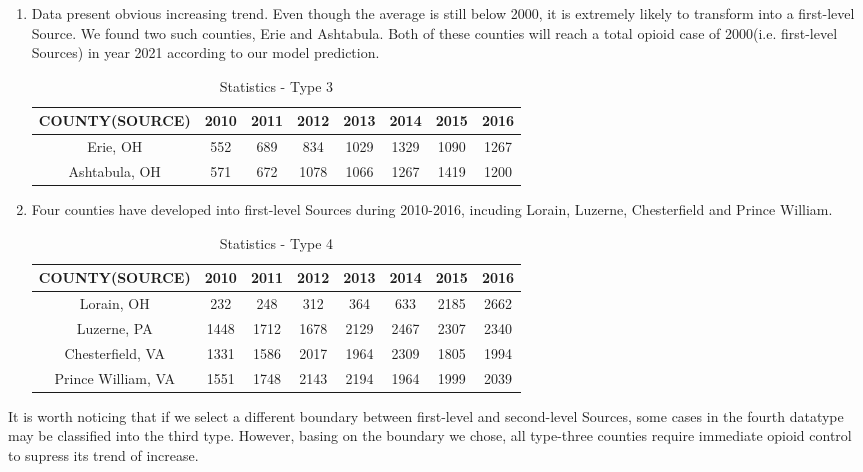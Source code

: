 \begin{enumerate}
	\item Data present obvious increasing trend. Even though the average is still below 2000, it is extremely likely to transform into a first-level Source. We found two such counties, Erie and Ashtabula. Both of these counties will reach a total opioid case of 2000(i.e. first-level Sources) in year 2021 according to our model prediction.
	\begin{table}[H]
		\centering
		\begin{tabular}{|c|c|c|c|c|c|c|c|}
			\hline
			\rowcolor[HTML]{656565} 
			{\color[HTML]{FFFFFF} \textbf{COUNTY(SOURCE)}} & {\color[HTML]{FFFFFF} \textbf{2010}} & {\color[HTML]{FFFFFF} \textbf{2011}} & {\color[HTML]{FFFFFF} \textbf{2012}} & {\color[HTML]{FFFFFF} \textbf{2013}} & {\color[HTML]{FFFFFF} \textbf{2014}} & {\color[HTML]{FFFFFF} \textbf{2015}} & {\color[HTML]{FFFFFF} \textbf{2016}}\\ \hline
			 Erie, OH &552&689&834&1029&1329&1090&1267 \\ \hline
			 Ashtabula, OH&571&672&1078&1066&1267&1419&1200 \\ \hline
		\end{tabular}
		\centering
		\caption{Statistics - Type 3}
	\end{table}

	
	\item Four counties have developed into first-level Sources during 2010-2016, incuding Lorain, Luzerne, Chesterfield and Prince William. 
\begin{table}[H]
\centering
\begin{tabular}{|c|c|c|c|c|c|c|c|}
	\hline
	\rowcolor[HTML]{656565} 
	{\color[HTML]{FFFFFF} \textbf{COUNTY(SOURCE)}} &{\color[HTML]{FFFFFF} \textbf{2010}} & {\color[HTML]{FFFFFF} \textbf{2011}} & {\color[HTML]{FFFFFF} \textbf{2012}} & {\color[HTML]{FFFFFF} \textbf{2013}} & {\color[HTML]{FFFFFF} \textbf{2014}} & {\color[HTML]{FFFFFF} \textbf{2015}} & {\color[HTML]{FFFFFF} \textbf{2016}}\\ \hline
	 Lorain, OH&232&248&312&364&633&2185&2662 \\ \hline
	 Luzerne, PA&1448&1712&1678&2129&2467&2307&2340 \\ \hline
	 Chesterfield, VA&1331&1586&2017&1964&2309&1805&1994 \\ \hline
	 Prince William, VA&1551&1748&2143&2194&1964&1999&2039 \\ \hline
\end{tabular}
\centering
\caption{Statistics - Type 4}
\end{table}
\end{enumerate}

It is worth noticing that if we select a different boundary between first-level and second-level Sources, some cases in the fourth datatype may be classified into the third type. However, basing on the boundary we chose, all type-three counties require immediate opioid control to supress its trend of increase.





